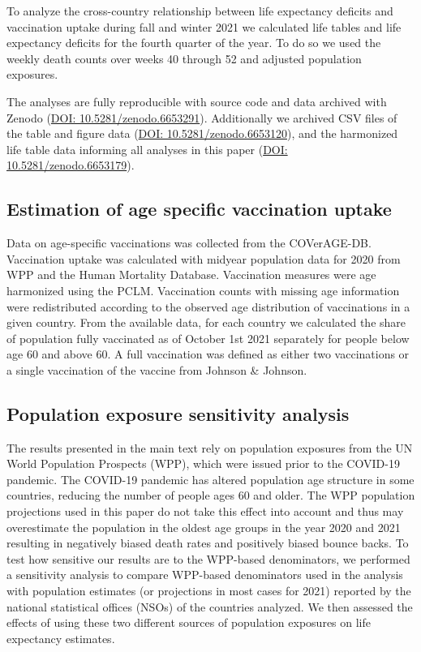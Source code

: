\documentclass[12pt]{article}
\begin{document}
To analyze the cross-country relationship between life expectancy deficits and vaccination uptake during fall and winter 2021 we calculated life tables and life expectancy deficits for the fourth quarter of the year. To do so we used the weekly death counts over weeks 40 through 52 and adjusted population exposures.

The analyses are fully reproducible with source code and data archived with Zenodo (\href{https://zenodo.org/record/6653291}{DOI:  10.5281/zenodo.6653291}). Additionally we archived CSV files of the table and figure data (\href{https://zenodo.org/record/6653120}{DOI: 10.5281/zenodo.6653120}), and the harmonized life table data informing all analyses in this paper (\href{https://zenodo.org/record/6653179}{DOI: 10.5281/zenodo.6653179}).

\subsection*{Estimation of age specific vaccination uptake}

Data on age-specific vaccinations was collected from the COVerAGE-DB.\citealp{Riffe2021} Vaccination uptake was calculated with midyear population data for 2020 from WPP\citealp{UnitedNations2021} and the Human Mortality Database. Vaccination measures were age harmonized using the PCLM. Vaccination counts with missing age information were redistributed according to the observed age distribution of vaccinations in a given country. From the available data, for each country we calculated the share of population fully vaccinated as of October 1st 2021 separately for people below age 60 and above 60. A full vaccination was defined as either two vaccinations or a single vaccination of the vaccine from Johnson \& Johnson.

\subsection*{Population exposure sensitivity analysis}

The results presented in the main text rely on population exposures from the UN World Population Prospects (WPP), which were issued prior to the COVID-19 pandemic. The COVID-19 pandemic has altered population age structure in some countries, reducing the number of people ages 60 and older. The WPP population projections used in this paper do not take this effect into account and thus may overestimate the population in the oldest age groups in the year 2020 and 2021 resulting in negatively biased death rates and positively biased bounce backs. To test how sensitive our results are to the WPP-based denominators, we performed a sensitivity analysis to compare WPP-based denominators used in the analysis with population estimates (or projections in most cases for 2021) reported by the national statistical offices (NSOs) of the countries analyzed. We then assessed the effects of using these two different sources of population exposures on life expectancy estimates.
\end{document}
